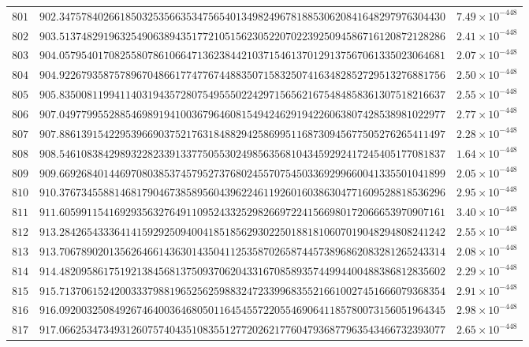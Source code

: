 \documentclass[12pt,reqno]{amsart}
\theoremstyle{remark}
\begin{document}
\begin{longtable}{clc}
$801$ & $902.3475784026618503253566353475654013498249678188530620841648297976304430$ & $7.49\times 10^{-448}$ \\
$802$ & $903.5137482919632549063894351772105156230522070223925094586716120872128286$ & $2.41\times 10^{-448}$ \\
$803$ & $904.0579540170825580786106647136238442103715461370129137567061335023064681$ & $2.07\times 10^{-448}$ \\
$804$ & $904.9226793587578967048661774776744883507158325074163482852729513276881756$ & $2.50\times 10^{-448}$ \\
$805$ & $905.8350081199411403194357280754955502242971565621675484858361307518216637$ & $2.55\times 10^{-448}$ \\
$806$ & $907.0497799552885469891941003679646081549424629194226063807428538981022977$ & $2.77\times 10^{-448}$ \\
$807$ & $907.8861391542295396690375217631848829425869951168730945677505276265411497$ & $2.28\times 10^{-448}$ \\
$808$ & $908.5461083842989322823391337750553024985635681043459292417245405177081837$ & $1.64\times 10^{-448}$ \\
$809$ & $909.6692684014469708038537457952737680245570754503369299660041335501041899$ & $2.05\times 10^{-448}$ \\
$810$ & $910.3767345588146817904673858956043962246119260160386304771609528818536296$ & $2.95\times 10^{-448}$ \\
$811$ & $911.6059911541692935632764911095243325298266972241566980172066653970907161$ & $3.40\times 10^{-448}$ \\
$812$ & $913.2842654333641415929250940041851856293022501881810607019048294808241242$ & $2.55\times 10^{-448}$ \\
$813$ & $913.7067890201356264661436301435041125358702658744573896862083281265243314$ & $2.08\times 10^{-448}$ \\
$814$ & $914.4820958617519213845681375093706204331670858935744994400488386812835602$ & $2.29\times 10^{-448}$ \\
$815$ & $915.7137061524200333798819652562598832472339968355216610027451666079368354$ & $2.91\times 10^{-448}$ \\
$816$ & $916.0920032508492674640036468050116454557220554690641185780073156051964345$ & $2.98\times 10^{-448}$ \\
$817$ & $917.0662534734931260757404351083551277202621776047936877963543466732393077$ & $2.65\times 10^{-448}$ \\

\end{longtable}
\end{document}
